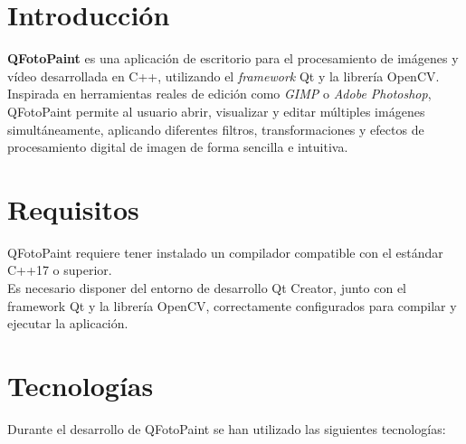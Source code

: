 \documentclass[11pt]{article}
\begin{document}
\section{Introducción}

  \textbf{QFotoPaint} es una aplicación de escritorio para el procesamiento de imágenes y vídeo desarrollada en C++, utilizando el \textit{framework} Qt y la librería OpenCV. \\

  Inspirada en herramientas reales de edición como \textit{GIMP} o \textit{Adobe
      Photoshop}, QFotoPaint permite al usuario abrir, visualizar y editar múltiples
  imágenes simultáneamente, aplicando diferentes filtros, transformaciones y
  efectos de procesamiento digital de imagen de forma sencilla e intuitiva.

\section{Requisitos}

  \noindent QFotoPaint requiere tener instalado un compilador compatible con el estándar C++17 o superior. \\

  Es necesario disponer del entorno de desarrollo Qt Creator, junto con el
  framework Qt y la librería OpenCV, correctamente configurados para compilar y
  ejecutar la aplicación. \\



\section{Tecnologías}

  \noindent Durante el desarrollo de QFotoPaint se han utilizado las siguientes tecnologías:
\end{document}
